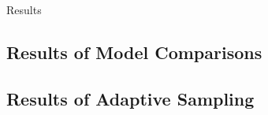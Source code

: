 Results

\subsection{Results of Model Comparisons}
\label{sec:modelres}


\subsection{Results of Adaptive Sampling}
\label{sec:adaptiveres}

